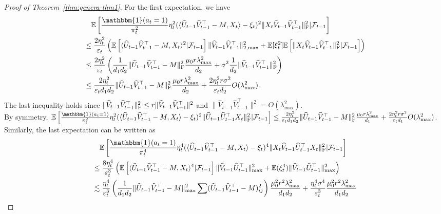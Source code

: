 \documentclass[12pt]{article}
\newcommand\fro[1]{\| #1 \|_{\rm{F}}}
\newcommand{\inp}[2]{\langle #1,#2\rangle}
\def\EE{{\mathbb E}}
\theoremstyle{plain}
\begin{document}
\begin{proof}[Proof of Theorem~\ref{thm:genera-thm1}]
    For the first expectation, we have
    \begin{align*}
        &\quad \EE\left[\frac{\mathbbm{1}(a_t=1)}{\pi_t^2}\eta_t^2(\inp{\widehat{U}_{t-1}\widehat{V}_{t-1}^{\top}-M}{X_t}-\xi_t)^2\fro{X_t\widehat{V}_{t-1}\widehat{V}_{t-1}^{\top}}^2 |\mathcal{F}_{t-1}\right] \\
        &\leq \frac{2\eta_t^2}{\varepsilon_t}\left(\EE\left[\inp{\widehat{U}_{t-1}\widehat{V}_{t-1}^{\top}-M}{X_t}^2|\mathcal{F}_{t-1}\right]\|\widehat{V}_{t-1}\widehat{V}_{t-1}^{\top}\|_{2,\max}^2 + \EE[\xi_t^2]\EE\left[\fro{X_t\widehat{V}_{t-1}\widehat{V}_{t-1}^{\top}}^2|\mathcal{F}_{t-1}\right]\right) \\
        &\leq \frac{2\eta_t^2}{\varepsilon_t}\left(\frac{1}{d_1d_2}\fro{\widehat{U}_{t-1}\widehat{V}_{t-1}^{\top}-M}^2\frac{\mu_0r\lambda_{\max}^2}{d_2} + \sigma^2\frac{1}{d_2}\fro{\widehat{V}_{t-1}\widehat{V}_{t-1}^{\top}}^2\right) \\
        &\leq \frac{2\eta_t^2}{\varepsilon_td_1d_2}\fro{\widehat{U}_{t-1}\widehat{V}_{t-1}^{\top}-M}^2\frac{\mu_0r\lambda_{\max}^2}{d_2} + \frac{2\eta_t^2r\sigma^2}{\varepsilon_td_2}O(\lambda_{\max}^2).
    \end{align*}
    The last inequality holds since $\fro{\widehat{V}_{t-1}\widehat{V}_{t-1}^{\top}}^2\leq r\|\widehat{V}_{t-1}\widehat{V}_{t-1}^{\top}\|^2$ and $\|\widehat{V}_{t-1}\widehat{V}_{t-1}^{\top}\|^2=O(\lambda_{\max}^2)$. \\
    By symmetry, $\EE\left[\frac{\mathbbm{1}(a_t=1)}{\pi_t^2}\eta_t^2(\inp{\widehat{U}_{t-1}\widehat{V}_{t-1}^{\top} - M}{X_t}-\xi_t)^2\fro{\widehat{U}_{t-1}\widehat{U}_{t-1}^{\top}X_t}^2 |\mathcal{F}_{t-1}\right]\leq \frac{2\eta_t^2}{\varepsilon_td_1d_2}\fro{\widehat{U}_{t-1}\widehat{V}_{t-1}^{\top}-M}^2\frac{\mu_0r\lambda_{\max}^2}{d_1} + \frac{2\eta_t^2r\sigma^2}{\varepsilon_td_1}O(\lambda_{\max}^2)$. Similarly, the last expectation can be written as
    \begin{align*}
        &\quad \EE\left[\frac{\mathbbm{1}(a_t=1)}{\pi_t^4}\eta_t^4(\inp{\widehat{U}_{t-1}\widehat{V}_{t-1}^{\top} - M}{X_t}-\xi_t)^4\fro{X_t\widehat{V}_{t-1}\widehat{U}_{t-1}^{\top}X_t}^2 |\mathcal{F}_{t-1}\right] \\
        &\leq \frac{8\eta_t^4}{\varepsilon_t^3}\left(\EE\left[\inp{\widehat{U}_{t-1}\widehat{V}_{t-1}^{\top}-M}{X_t}^4|\mathcal{F}_{t-1}\right]\|\widehat{V}_{t-1}\widehat{U}_{t-1}^{\top}\|_{\max}^2 + \EE(\xi_t^4)\|\widehat{V}_{t-1}\widehat{U}_{t-1}^{\top}\|_{\max}^2 \right) \\
        &\lesssim \frac{\eta_t^4}{\varepsilon_t^3}\left(\frac{1}{d_1d_2}\|\widehat{U}_{t-1}\widehat{V}_{t-1}^{\top}-M\|_{\max}^2\sum(\widehat{U}_{t-1}\widehat{V}_{t-1}^{\top}-M)_{ij}^2\right)\frac{\mu_0^2r^2\lambda_{\max}^2}{d_1d_2} + \frac{\eta_t^4\sigma^4}{\varepsilon_t^3}\frac{\mu_0^2r^2\lambda_{\max}^2}{d_1d_2} \\

\end{align*}
\end{proof}
\end{document}
